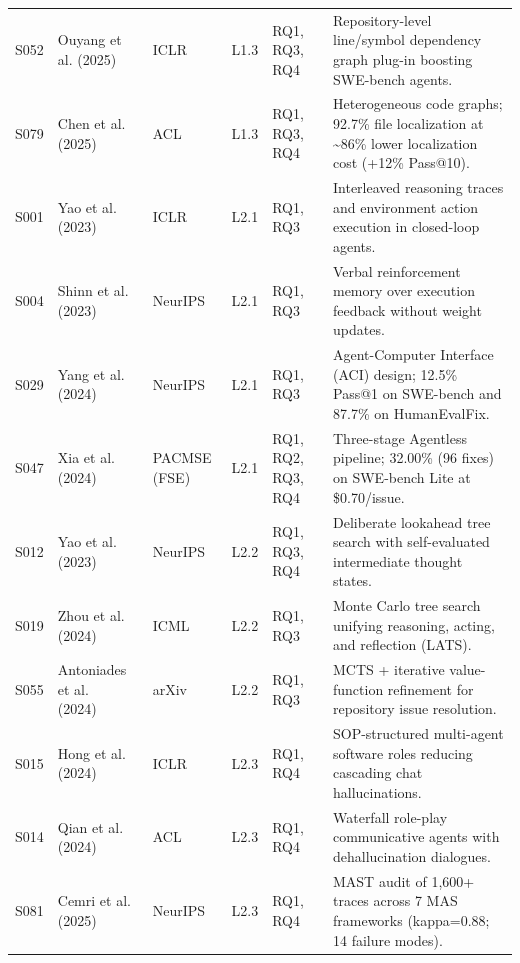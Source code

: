 \documentclass[10pt,twocolumn,a4paper]{article}
\begin{document}
\begin{table}[t!]
\begin{tabularx}{\textwidth}{l >{\raggedright\arraybackslash}p{2.65cm} >{\raggedright\arraybackslash}p{2.05cm} c >{\raggedright\arraybackslash}p{1.40cm} X}
S052 & Ouyang et al. (2025)~\cite{ouyang2025repograph} & ICLR & L1.3 & RQ1, RQ3, RQ4 & Repository-level line/symbol dependency graph plug-in boosting SWE-bench agents. \\
S079 & Chen et al. (2025)~\cite{chen2025locagent} & ACL & L1.3 & RQ1, RQ3, RQ4 & Heterogeneous code graphs; 92.7\% file localization at \textasciitilde{}86\% lower localization cost (+12\% Pass@10). \\
S001 & Yao et al. (2023)~\cite{yao2023react} & ICLR & L2.1 & RQ1, RQ3 & Interleaved reasoning traces and environment action execution in closed-loop agents. \\
S004 & Shinn et al. (2023)~\cite{shinn2023reflexion} & NeurIPS & L2.1 & RQ1, RQ3 & Verbal reinforcement memory over execution feedback without weight updates. \\
S029 & Yang et al. (2024)~\cite{yang2024sweagent} & NeurIPS & L2.1 & RQ1, RQ3 & Agent-Computer Interface (ACI) design; 12.5\% Pass@1 on SWE-bench and 87.7\% on HumanEvalFix. \\
S047 & Xia et al. (2024)~\cite{xia2024demystifying} & PACMSE (FSE) & L2.1 & RQ1, RQ2, RQ3, RQ4 & Three-stage Agentless pipeline; 32.00\% (96 fixes) on SWE-bench Lite at \$0.70/issue. \\
S012 & Yao et al. (2023)~\cite{yao2023tree} & NeurIPS & L2.2 & RQ1, RQ3, RQ4 & Deliberate lookahead tree search with self-evaluated intermediate thought states. \\
S019 & Zhou et al. (2024)~\cite{zhou2024language} & ICML & L2.2 & RQ1, RQ3 & Monte Carlo tree search unifying reasoning, acting, and reflection (LATS). \\
S055 & Antoniades et al. (2024)~\cite{antoniades2024swesearch} & arXiv & L2.2 & RQ1, RQ3 & MCTS + iterative value-function refinement for repository issue resolution. \\
S015 & Hong et al. (2024)~\cite{hong2024metagpt} & ICLR & L2.3 & RQ1, RQ4 & SOP-structured multi-agent software roles reducing cascading chat hallucinations. \\
S014 & Qian et al. (2024)~\cite{qian2024chatdev} & ACL & L2.3 & RQ1, RQ4 & Waterfall role-play communicative agents with dehallucination dialogues. \\
S081 & Cemri et al. (2025)~\cite{cemri2025multiagent} & NeurIPS & L2.3 & RQ1, RQ4 & MAST audit of 1,600+ traces across 7 MAS frameworks (kappa=0.88; 14 failure modes). \\
\bottomrule
\end{tabularx}
\end{table}
\end{document}
